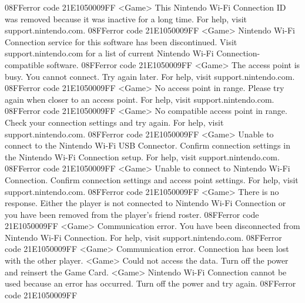 {08}{FF}error code {21}{E1}{05}{00}{09}{FF} 
<Game> This Nintendo Wi-Fi Connection ID 
was removed because it was inactive for a 
long time. For help, visit support.nintendo.com. 
{08}{FF}error code {21}{E1}{05}{00}{09}{FF} 
<Game> Nintendo Wi-Fi Connection service for this software has been discontinued. 
Visit support.nintendo.com 
for a list of current Nintendo Wi-Fi Connection- compatible software. 
{08}{FF}error code {21}{E1}{05}{00}{09}{FF} 
<Game> The access point is busy. You cannot connect. Try again later. 
For help, visit support.nintendo.com. 
{08}{FF}error code {21}{E1}{05}{00}{09}{FF} 
<Game> No access point in range. 
Please try again when closer to an access point. 
For help, visit support.nintendo.com. 
{08}{FF}error code {21}{E1}{05}{00}{09}{FF} 
<Game> No compatible access point in range. Check your connection 
settings and try again. For help, visit support.nintendo.com. 
{08}{FF}error code {21}{E1}{05}{00}{09}{FF} 
<Game> Unable to connect to the Nintendo Wi-Fi USB Connector. 
Confirm connection settings in the Nintendo Wi-Fi Connection setup. 
For help, visit support.nintendo.com. 
{08}{FF}error code {21}{E1}{05}{00}{09}{FF} 
<Game> Unable to connect to Nintendo Wi-Fi Connection. 
Confirm connection settings and access point settings. 
For help, visit support.nintendo.com. 
{08}{FF}error code {21}{E1}{05}{00}{09}{FF} 
<Game> There is no response. Either the player is not connected to 
Nintendo Wi-Fi Connection or you have 
been removed from the player's friend roster. 
{08}{FF}error code {21}{E1}{05}{00}{09}{FF} 
<Game> Communication error. You have been disconnected from Nintendo Wi-Fi Connection. 
For help, visit support.nintendo.com. 
{08}{FF}error code {21}{E1}{05}{00}{09}{FF} 
<Game> Communication error. Connection has been lost with the other player. 
<Game> Could not access the data. Turn off the power and reinsert the Game Card.
<Game> Nintendo Wi-Fi Connection cannot be used because an error has occurred. 
Turn off the power and try again. 
{08}{FF}error code {21}{E1}{05}{00}{09}{FF} 
